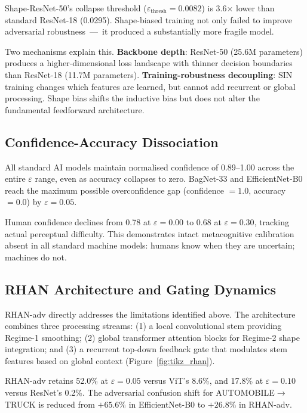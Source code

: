 \documentclass[12pt,a4paper]{article}
\begin{document}
Shape-ResNet-50's collapse threshold ($\varepsilon_{\text{thresh}}{=}0.0082$)
is 3.6$\times$ lower than standard ResNet-18 (0.0295).
Shape-biased training not only failed to improve adversarial robustness~---~it
produced a substantially more fragile model.

Two mechanisms explain this.
\textbf{Backbone depth}: ResNet-50 (25.6M parameters) produces a
higher-dimensional loss landscape with thinner decision boundaries than
ResNet-18 (11.7M parameters).
\textbf{Training-robustness decoupling}: SIN training changes which features
are learned, but cannot add recurrent or global processing.
Shape bias shifts the inductive bias but does not alter the fundamental
feedforward architecture.

\subsection{Confidence-Accuracy Dissociation}

All standard AI models maintain normalised confidence of 0.89--1.00 across
the entire $\varepsilon$ range, even as accuracy collapses to zero.
BagNet-33 and EfficientNet-B0 reach the maximum possible overconfidence gap
(confidence $= 1.0$, accuracy $= 0.0$) by $\varepsilon{=}0.05$.

Human confidence declines from 0.78 at $\varepsilon{=}0.00$ to 0.68 at
$\varepsilon{=}0.30$, tracking actual perceptual difficulty.
This demonstrates intact metacognitive calibration absent in all standard
machine models: humans know when they are uncertain; machines do not.

\subsection{RHAN Architecture and Gating Dynamics}

RHAN-adv directly addresses the limitations identified above.
The architecture combines three processing streams:
(1) a local convolutional stem providing Regime-1 smoothing;
(2) global transformer attention blocks for Regime-2 shape integration; and
(3) a recurrent top-down feedback gate that modulates stem features based
on global context (Figure~\ref{fig:tikz_rhan}).

RHAN-adv retains 52.0\% at $\varepsilon{=}0.05$ versus ViT's 8.6\%,
and 17.8\% at $\varepsilon{=}0.10$ versus ResNet's 0.2\%.
The adversarial confusion shift for AUTOMOBILE$\to$TRUCK is reduced from
$+65.6\%$ in EfficientNet-B0 to $+26.8\%$ in RHAN-adv.
\end{document}
